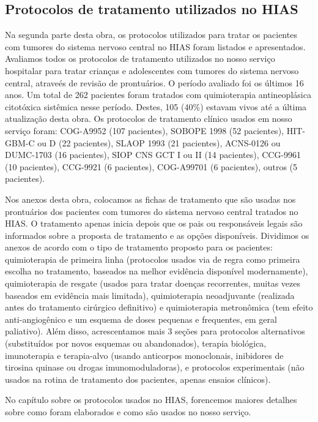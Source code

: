 \documentclass[11pt,a4paper,oldfontcommands]{memoir}
\begin{document}
\subsection{Protocolos de tratamento utilizados no HIAS}

Na segunda parte desta obra, os protocolos utilizados para tratar os pacientes com tumores do sistema nervoso central no HIAS foram listados e apresentados. Avaliamos todos os protocolos de tratamento utilizados no nosso serviço hospitalar para tratar crianças e adolescentes com tumores do sistema nervoso central, atraveés de revisão de prontuários. O período avaliado foi os últimos 16 anos. Um total de 262 pacientes foram tratados com quimioterapia antineoplásica citotóxica sistêmica nesse período. Destes, 105 (40\%) estavam vivos até a última atualização desta obra. Os protocolos de tratamento clínico usados em nosso serviço foram: COG-A9952 \cite{Ater20072012} (107 pacientes), SOBOPE 1998 (52 pacientes), HIT-GBM-C ou D \cite{Wolff2011} (22 pacientes), SLAOP 1993 \cite{slaop1} (21 pacientes), ACNS-0126 \cite{noq191} ou DUMC-1703 (16 pacientes), SIOP CNS GCT I ou II (14 pacientes), CCG-9961 \cite{4980} (10 pacientes), CCG-9921 \cite{095} (6 pacientes), COG-A99701 \cite{2792} (6 pacientes), outros (5 pacientes). 

Nos anexos desta obra, colocamos as fichas de tratamento que são usadas nos prontuários dos pacientes com tumores do sistema nervoso central tratados no HIAS. O tratamento apenas inicia depois que os pais ou responsáveis legais são informados sobre a proposta de tratamento e as opções disponíveis. Dividimos os anexos de acordo com o tipo de tratamento proposto para os pacientes: quimioterapia de primeira linha (protocolos usados via de regra como primeira escolha no tratamento, baseados na melhor evidência disponível modernamente), quimioterapia de resgate (usados para tratar doenças recorrentes, muitas vezes baseados em evidência mais limitada), quimioterapia neoadjuvante (realizada antes do tratamento cirúrgico definitivo) e quimioterapia metronômica (tem efeito anti-angiogênico e um esquema de doses pequenas e frequentes, em geral paliativo). Além disso, acrescentamos mais 3 seções para protocolos alternativos (substituídos por novos esquemas ou abandonados), terapia biológica, imunoterapia e terapia-alvo (usando anticorpos monoclonais, inibidores de tirosina quinase ou drogas imunomoduladoras), e protocolos experimentais (não usados na rotina de tratamento dos pacientes, apenas ensaios clínicos).

No capítulo sobre os protocolos usados no HIAS, forencemos maiores detalhes sobre como foram elaborados e como são usados no nosso serviço.
\end{document}
